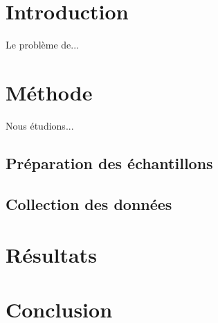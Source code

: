 \documentclass{article}
\begin{document}
\section{Introduction}
Le problème de...

\section{Méthode}
Nous étudions...

\subsection{Préparation des
échantillons}

\subsection{Collection des données}

\section{Résultats}

\section{Conclusion}
\end{document}
